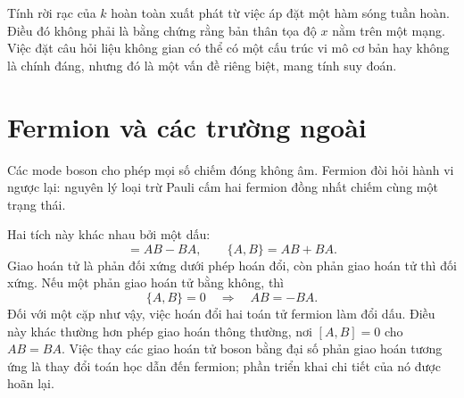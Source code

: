 \begin{classroomqa}
\end{classroomqa}


Tính rời rạc của \(k\) hoàn toàn xuất phát từ việc áp đặt một hàm sóng tuần hoàn. Điều đó không phải là bằng chứng rằng bản thân tọa độ \(x\) nằm trên một mạng. Việc đặt câu hỏi liệu không gian có thể có một cấu trúc vi mô cơ bản hay không là chính đáng, nhưng đó là một vấn đề riêng biệt, mang tính suy đoán.

\section{Fermion và các trường ngoài}

Các mode boson cho phép mọi số chiếm đóng không âm. Fermion đòi hỏi hành vi ngược lại: nguyên lý loại trừ Pauli cấm hai fermion đồng nhất chiếm cùng một trạng thái.

\begin{classroomqa}
\end{classroomqa}

Hai tích này khác nhau bởi một dấu:
\begin{equation}
[A,B]=AB-BA,
\qquad
\{A,B\}=AB+BA.
\end{equation}
Giao hoán tử là phản đối xứng dưới phép hoán đổi, còn phản giao hoán tử thì đối xứng. Nếu một phản giao hoán tử bằng không, thì
\begin{equation}
\{A,B\}=0
\quad\Longrightarrow\quad
AB=-BA.
\end{equation}
Đối với một cặp như vậy, việc hoán đổi hai toán tử fermion làm đổi dấu. Điều này khác thường hơn phép giao hoán thông thường, nơi \([A,B]=0\) cho \(AB=BA\). Việc thay các giao hoán tử boson bằng đại số phản giao hoán tương ứng là thay đổi toán học dẫn đến fermion; phần triển khai chi tiết của nó được hoãn lại.

